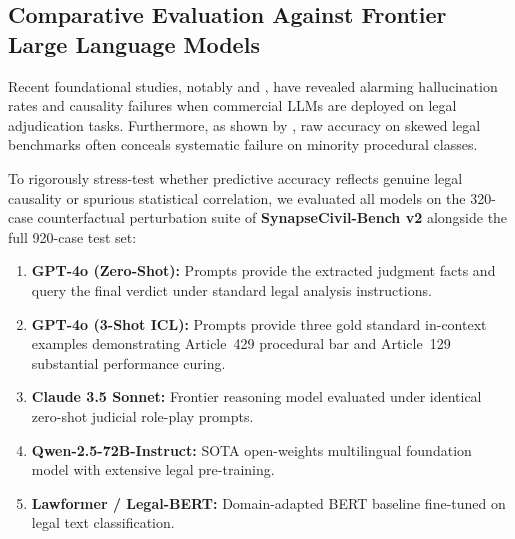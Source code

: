 \documentclass[11pt,a4paper]{article}
\begin{document}
\subsection{Comparative Evaluation Against Frontier Large Language Models}
\label{sec:llm_comparison}
Recent foundational studies, notably \citet{dahl2024large} and \citet{chen2024causal}, have revealed alarming hallucination rates and causality failures when commercial LLMs are deployed on legal adjudication tasks. Furthermore, as shown by \citet{ualegalbench2026}, raw accuracy on skewed legal benchmarks often conceals systematic failure on minority procedural classes.

To rigorously stress-test whether predictive accuracy reflects genuine legal causality or spurious statistical correlation, we evaluated all models on the 320-case counterfactual perturbation suite of \textbf{SynapseCivil-Bench v2} alongside the full 920-case test set:
\begin{enumerate}[label=(\roman*)]
    \item \textbf{GPT-4o (Zero-Shot):} Prompts provide the extracted judgment facts and query the final verdict under standard legal analysis instructions.
    \item \textbf{GPT-4o (3-Shot ICL):} Prompts provide three gold standard in-context examples demonstrating Article~429 procedural bar and Article~129 substantial performance curing.
    \item \textbf{Claude 3.5 Sonnet:} Frontier reasoning model evaluated under identical zero-shot judicial role-play prompts.
    \item \textbf{Qwen-2.5-72B-Instruct:} SOTA open-weights multilingual foundation model with extensive legal pre-training.
    \item \textbf{Lawformer / Legal-BERT:} Domain-adapted BERT baseline fine-tuned on legal text classification.
\end{enumerate}
\end{document}
